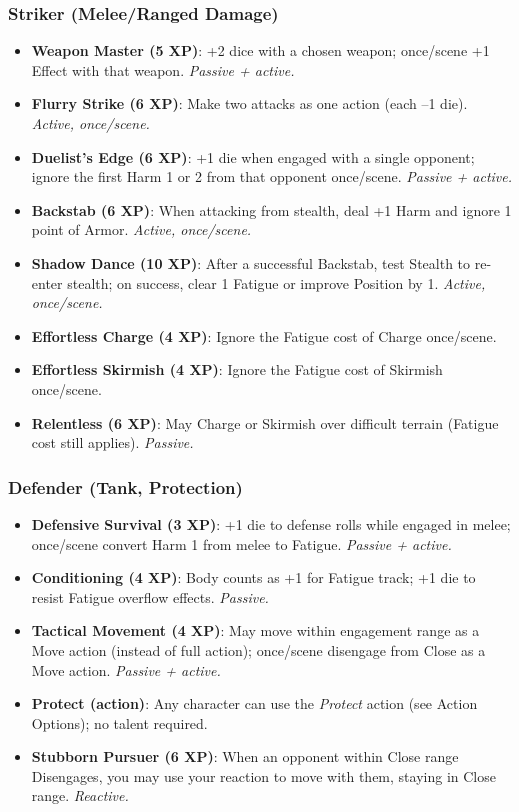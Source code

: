 \subsubsection*{Striker (Melee/Ranged Damage)}
\begin{itemize}
  \item \textbf{Weapon Master (5 XP)}: +2 dice with a chosen weapon; once/scene +1 Effect with that weapon. \textit{Passive + active.}
  \item \textbf{Flurry Strike (6 XP)}: Make two attacks as one action (each –1 die). \textit{Active, once/scene.}
  \item \textbf{Duelist's Edge (6 XP)}: +1 die when engaged with a single opponent; ignore the first Harm 1 or 2 from that opponent once/scene. \textit{Passive + active.}
  \item \textbf{Backstab (6 XP)}: When attacking from stealth, deal +1 Harm and ignore 1 point of Armor. \textit{Active, once/scene.}
  \item \textbf{Shadow Dance (10 XP)}: After a successful Backstab, test Stealth to re-enter stealth; on success, clear 1 Fatigue or improve Position by 1. \textit{Active, once/scene.}
  \item \textbf{Effortless Charge (4 XP)}: Ignore the Fatigue cost of Charge once/scene.
  \item \textbf{Effortless Skirmish (4 XP)}: Ignore the Fatigue cost of Skirmish once/scene.
  \item \textbf{Relentless (6 XP)}: May Charge or Skirmish over difficult terrain (Fatigue cost still applies). \textit{Passive.}
\end{itemize}

\subsubsection*{Defender (Tank, Protection)}
\begin{itemize}
  \item \textbf{Defensive Survival (3 XP)}: +1 die to defense rolls while engaged in melee; once/scene convert Harm 1 from melee to Fatigue. \textit{Passive + active.}
  \item \textbf{Conditioning (4 XP)}: Body counts as +1 for Fatigue track; +1 die to resist Fatigue overflow effects. \textit{Passive.}
  \item \textbf{Tactical Movement (4 XP)}: May move within engagement range as a Move action (instead of full action); once/scene disengage from Close as a Move action. \textit{Passive + active.}
  \item \textbf{Protect (action)}: Any character can use the \textit{Protect} action (see Action Options); no talent required.
  \item \textbf{Stubborn Pursuer (6 XP)}: When an opponent within Close range Disengages, you may use your reaction to move with them, staying in Close range. \textit{Reactive.}
\end{itemize}

